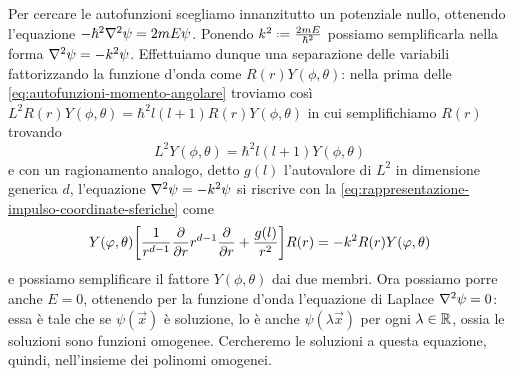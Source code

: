 Per cercare le autofunzioni scegliamo innanzitutto un potenziale nullo, ottenendo l'equazione $-\hbar^2\nabla^2\psi=2mE\psi$.
Ponendo $k^2\defeq\frac{2mE}{\hbar^2}$ possiamo semplificarla nella forma $\nabla^2\psi=-k^2\psi$.
Effettuiamo dunque una separazione delle variabili fattorizzando la funzione d'onda come $R(r)Y(\phi,\theta)$: nella prima delle \eqref{eq:autofunzioni-momento-angolare} troviamo cos\`i $L^2R(r)Y(\phi,\theta)=\hbar^2l(l+1)R(r)Y(\phi,\theta)$ in cui semplifichiamo $R(r)$ trovando
\begin{equation}
	L^2Y(\phi,\theta)=\hbar^2l(l+1)Y(\phi,\theta)
\end{equation}
e con un ragionamento analogo, detto $g(l)$ l'autovalore di $L^2$ in dimensione generica $d$, l'equazione $\nabla^2\psi=-k^2\psi$ si riscrive con la \eqref{eq:rappresentazione-impulso-coordinate-sferiche} come
\begin{equation}
	Y(\varphi,\theta)\bigg[\frac1{r^{d-1}}\frac{\partial {}}{\partial {r}}r^{d-1}\frac{\partial {}}{\partial {r}}+\frac{g(l)}{r^2}\bigg]R(r)=-k^2R(r)Y(\varphi,\theta)
	\label{eq:laplace-parte-radiale}
\end{equation}
e possiamo semplificare il fattore $Y(\phi,\theta)$ dai due membri.
Ora possiamo porre anche $E=0$, ottenendo per la funzione d'onda l'equazione di Laplace $\nabla^2\psi=0$: essa è tale che se $\psi(\vec x)$ è soluzione, lo è anche $\psi(\lambda\vec x)$ per ogni $\lambda\in\mathbb{R}$, ossia le soluzioni sono funzioni omogenee.
Cercheremo le soluzioni a questa equazione, quindi, nell'insieme dei polinomi omogenei.

